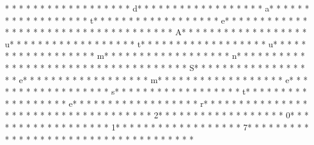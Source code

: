* * *  * * *  * * *  *  * * *  *  * * *  * d* * *  * * *  * * *  *  * * *  *  * * *  * a* * *  * * *  * * *  *  * * *  *  * * *  * t* * *  * * *  * * *  *  * * *  *  * * *  * e* * *  * * *  * * *  *  * * *  *  * * *  * {* * *  * * *  * * *  *  * * *  *  * * *  * A* * *  * * *  * * *  *  * * *  *  * * *  * u* * *  * * *  * * *  *  * * *  *  * * *  * t* * *  * * *  * * *  *  * * *  *  * * *  * u* * *  * * *  * * *  *  * * *  *  * * *  * m* * *  * * *  * * *  *  * * *  *  * * *  * n* * *  * * *  * * *  *  * * *  *  * * *  *  * * *  * * *  * * *  *  * * *  *  * * *  * S* * *  * * *  * * *  *  * * *  *  * * *  * e* * *  * * *  * * *  *  * * *  *  * * *  * m* * *  * * *  * * *  *  * * *  *  * * *  * e* * *  * * *  * * *  *  * * *  *  * * *  * s* * *  * * *  * * *  *  * * *  *  * * *  * t* * *  * * *  * * *  *  * * *  *  * * *  * e* * *  * * *  * * *  *  * * *  *  * * *  * r* * *  * * *  * * *  *  * * *  *  * * *  *  * * *  * * *  * * *  *  * * *  *  * * *  * 2* * *  * * *  * * *  *  * * *  *  * * *  * 0* * *  * * *  * * *  *  * * *  *  * * *  * 1* * *  * * *  * * *  *  * * *  *  * * *  * 7* * *  * * *  * * *  *  * * *  *  * * *  * }* * *  * * *  * * *  *  * * *  *  * * *  * 
